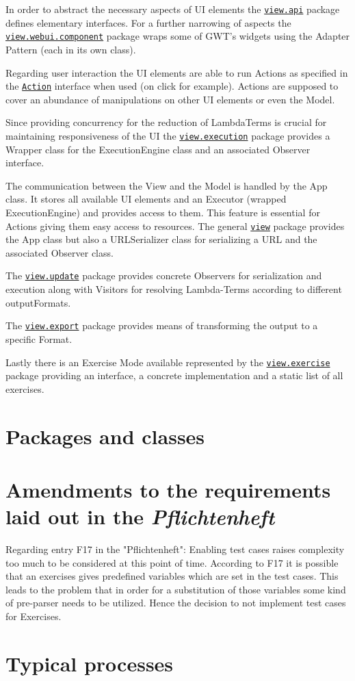 \documentclass[a4paper, parskip=half]{scrartcl}
\newcommand{\pkglnk}[1]{\hyperref[pkg:edu.kit.wavelength.client.#1]{#1}}
\begin{document}
In order to abstract the necessary aspects of UI elements the \texttt{\pkglnk{view.api}} package 
defines elementary interfaces.
For a further narrowing of aspects the \texttt{\pkglnk{view.webui.component}} package wraps some of 
GWT's widgets using the Adapter Pattern (each in its own class).

Regarding user interaction the UI elements are able to run Actions as specified in the 
\texttt{\hyperref[type:edu.kit.wavelength.client.view.action.Action]{Action}} interface when used (on click for example).
Actions are supposed to cover an abundance of manipulations on other UI elements or even the Model.

Since providing concurrency for the reduction of LambdaTerms is crucial for maintaining responsiveness of the UI 
the \texttt{\pkglnk{view.execution}} package provides a Wrapper class for the ExecutionEngine class and an associated
Observer interface.

The communication between the View and the Model is handled by the App class. It stores all available UI elements and
an Executor (wrapped ExecutionEngine) and provides access to them. This feature is essential for Actions giving them
easy access to resources.
The general \texttt{\pkglnk{view}} package provides the App class but also a URLSerializer class for serializing a URL
and the associated Observer class.

The \texttt{\pkglnk{view.update}} package provides concrete Observers for serialization and execution along with
Visitors for resolving Lambda-Terms according to different outputFormats.

The \texttt{\pkglnk{view.export}} package provides means of transforming the output to a specific Format.

Lastly there is an Exercise Mode available represented by the \texttt{\pkglnk{view.exercise}} package providing
an interface, a concrete implementation and a static list of all exercises.

\pagebreak
\section{Packages and classes}


\section{Amendments to the requirements laid out in the \textit{Pflichtenheft}}

Regarding entry F17 in the "Pflichtenheft":
Enabling test cases raises complexity too much to be considered at this point of time.
According to F17 it is possible that an exercises gives predefined variables which
are set in the test cases. This leads to the problem that in order for a substitution of
those variables some kind of pre-parser needs to be utilized.
Hence the decision to not implement test cases for Exercises.

\section{Typical processes}

\end{document}

